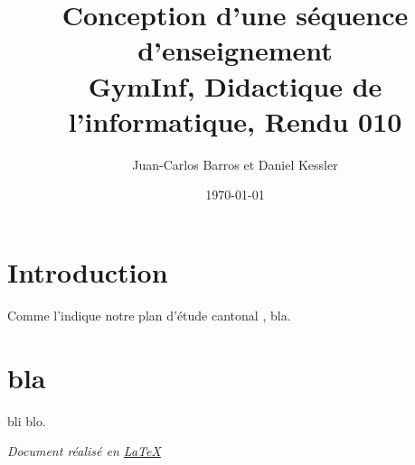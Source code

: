 \documentclass[11pt]{scrartcl}
\author{Juan-Carlos Barros et Daniel Kessler}
\date{\today}
\title{Conception d'une séquence d'enseignement\\\medskip
  \large GymInf, Didactique de l'informatique, Rendu 010}
\begin{document}
\maketitle
\tableofcontents

\pagebreak

\section{Introduction}
Comme l'indique notre plan d'étude cantonal \cite{pecinfo}, bla.

\section{bla}
bli blo.



\vfill
\emph{Document réalisé en \href{https://www.latex-project.org/}{\LaTeX}}
\end{document}
